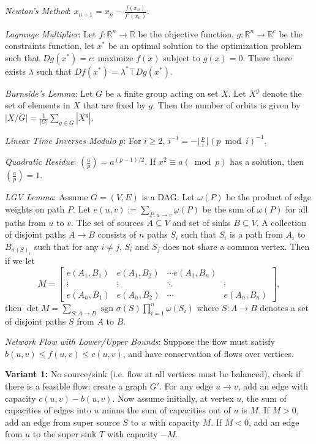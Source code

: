 \emph{Newton's Method}: $x_{n+1} = x_n - \frac{f(x_n)}{f'(x_n)}$.

\emph{Lagrange Multiplier}: Let $f: \mathbb{R}^n \rightarrow \mathbb{R}$ be the objective function, $g: \mathbb{R}^n \rightarrow \mathbb{R}^c$ be the constraints function, let $x^*$ be an optimal solution to the optimization problem such that $Dg(x^*) = c$: maximize $f(x)$ subject to $g(x) = 0$. There there exists $\lambda$ such that $Df(x^*) = \lambda^*\top Dg(x^*)$.

\emph{Burnside's Lemma}: Let $G$ be a finite group acting on set $X$. Let $X^g$ denote the set of elements in $X$ that are fixed by $g$. Then the number of orbits is given by $|X/G| = \frac{1}{|G|}\sum_{g \in G}|X^g|$.

\emph{Linear Time Inverses Modulo $p$}: For $i \geq 2$, $i^{-1} = -\lfloor \frac{p}{i} \rfloor (p \bmod i)^{-1}$.

\emph{Quadratic Residue}: $\left(\frac{a}{p} \right) = a^{(p-1)/2}$. If $x^2 \equiv a (\bmod p)$ has a solution, then $\left(\frac{a}{p} \right) = 1$.

\emph{LGV Lemma}: Assume $G = (V,E)$ is a DAG. Let $\omega(P)$ be the product of edge weights on path $P$. Let $e(u,v) := \sum_{P: u \rightarrow v} \omega(P)$ be the sum of $\omega(P)$ for all paths from $u$ to $v$. The set of sources $A \subseteq V$ and set of sinks $B \subseteq V$. A collection of disjoint paths $A \rightarrow B$ consists of $n$ paths $S_i$ such that $S_i$ is a path from $A_i$ to $B_{\sigma(S)_i}$ such that for any $i \neq j$, $S_i$ and $S_j$ does not share a common vertex. Then if we let
\begin{equation*}
  M = \begin{bmatrix} e(A_1,B_1) & e(A_1,B_2) & \cdots  e(A_1,B_n)\\ \vdots & \vdots & \ddots & \vdots \\ e(A_n,B_1) & e(A_n,B_2) & \cdots & e(A_n,B_n) \end{bmatrix},
\end{equation*}
then $\det M = \sum_{S: A \rightarrow B}\text{ sgn } \sigma(S) \prod_{i=1}^n \omega(S_i)$
where $S: A \rightarrow B$ denotes a set of disjoint paths $S$ from $A$ to $B$.

\emph{Network Flow with Lower/Upper Bounds}: Suppose the flow must satisfy $b(u,v) \leq f(u,v) \leq c(u,v)$, and have conservation of flows over vertices.

\textbf{Variant 1:} No source/sink (i.e. flow at all vertices must be balanced), check if there is a feasible flow: create a graph $G'$. For any edge $u \rightarrow v$, add an edge with capacity $c(u,v) - b(u,v)$. Now assume initially, at vertex $u$, the sum of capacities of edges into $u$ minus the sum of capacities out of $u$ is $M$. If $M > 0$, add an edge from super source $S$ to $u$ with capacity $M$. If $M < 0$, add an edge from $u$ to the super sink $T$ with capacity $-M$.

